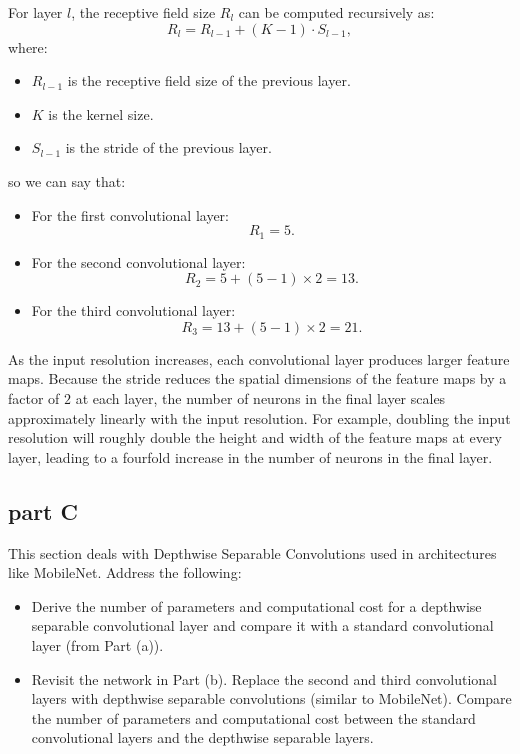 \begin{qsolve}
\begin{qsolve}[]
        For layer $l$, the receptive field size $R_l$ can be computed recursively as:
        \[
        R_l = R_{l-1} + (K - 1) \cdot S_{l-1},
        \]
        where:
        \splitqsolve[\splitqsolve]
        \begin{itemize}
            \item $R_{l-1}$ is the receptive field size of the previous layer.
            \item $K$ is the kernel size.
            \item $S_{l-1}$ is the stride of the previous layer.
        \end{itemize}
        so we can say that:
        \begin{itemize}
            \item For the first convolutional layer:
            \[
            R_1 = 5.
            \]
            \item For the second convolutional layer:
            \[
            R_2 = 5 + (5 - 1) \times 2 = 13.
            \]
            \item For the third convolutional layer:
            \[
            R_3 = 13 + (5 - 1) \times 2 = 21.
            \]
        \end{itemize}
        As the input resolution increases, each convolutional layer produces larger feature maps. 
        Because the stride reduces the spatial dimensions of the feature maps by a factor of $2$ at each layer, the number of neurons in the final layer scales approximately linearly with the input resolution.
        For example, doubling the input resolution will roughly double the height and width of the feature maps at every layer, leading to a fourfold increase in the number of neurons in the final layer.        

    \end{qsolve}
\end{qsolve}
\subsection{part C}
This section deals with Depthwise Separable Convolutions used in architectures like MobileNet. Address the following:
\begin{itemize}
    \item Derive the number of parameters and computational cost for a depthwise separable convolutional layer and compare it with a standard convolutional layer (from Part (a)).
    \item Revisit the network in Part (b). Replace the second and third convolutional layers with depthwise separable convolutions (similar to MobileNet). Compare the number of parameters and computational cost between the standard convolutional layers and the depthwise separable layers.
\end{itemize}

